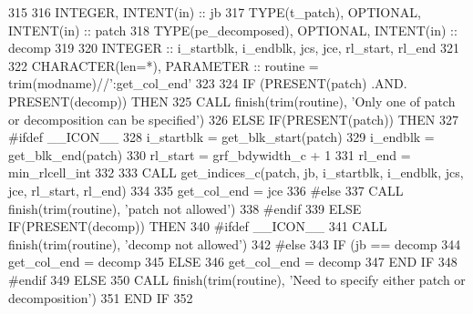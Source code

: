 \begin{DoxyCode}
315 
316     \textcolor{keywordtype}{INTEGER},                       \textcolor{keywordtype}{INTENT(in)} :: jb
317     \textcolor{keywordtype}{TYPE}(t\_patch),       \textcolor{keywordtype}{OPTIONAL}, \textcolor{keywordtype}{INTENT(in)} :: patch
318     \textcolor{keywordtype}{TYPE}(pe\_decomposed), \textcolor{keywordtype}{OPTIONAL}, \textcolor{keywordtype}{INTENT(in)} :: decomp
319 
320     \textcolor{keywordtype}{INTEGER} :: i\_startblk, i\_endblk, jcs, jce, rl\_start, rl\_end
321 
322     \textcolor{keywordtype}{CHARACTER(len=*)}, \textcolor{keywordtype}{PARAMETER} :: routine = trim(modname)//\textcolor{stringliteral}{':get\_col\_end'}
323 
324     \textcolor{keywordflow}{IF} (\textcolor{keyword}{PRESENT}(patch) .AND. \textcolor{keyword}{PRESENT}(decomp)) \textcolor{keywordflow}{THEN}
325       \textcolor{keyword}{CALL }finish(trim(routine), \textcolor{stringliteral}{'Only one of patch or decomposition can be specified'})
326     \textcolor{keywordflow}{ELSE} \textcolor{keywordflow}{IF}(\textcolor{keyword}{PRESENT}(patch)) \textcolor{keywordflow}{THEN}
327 \textcolor{preprocessor}{#ifdef \_\_ICON\_\_}
328 \textcolor{preprocessor}{}      i\_startblk = get\_blk\_start(patch)
329       i\_endblk   = get\_blk\_end(patch)
330       rl\_start   = grf\_bdywidth\_c + 1
331       rl\_end     = min\_rlcell\_int
332 
333       \textcolor{keyword}{CALL }get\_indices\_c(patch, jb, i\_startblk, i\_endblk, jcs, jce, rl\_start, rl\_end)
334 
335       get\_col\_end = jce
336 \textcolor{preprocessor}{#else}
337 \textcolor{preprocessor}{}      \textcolor{keyword}{CALL }finish(trim(routine), \textcolor{stringliteral}{'patch not allowed'})
338 \textcolor{preprocessor}{#endif}
339 \textcolor{preprocessor}{}    \textcolor{keywordflow}{ELSE} \textcolor{keywordflow}{IF}(\textcolor{keyword}{PRESENT}(decomp)) \textcolor{keywordflow}{THEN}
340 \textcolor{preprocessor}{#ifdef \_\_ICON\_\_}
341 \textcolor{preprocessor}{}      \textcolor{keyword}{CALL }finish(trim(routine), \textcolor{stringliteral}{'decomp not allowed'})
342 \textcolor{preprocessor}{#else}
343 \textcolor{preprocessor}{}      \textcolor{keywordflow}{IF} (jb == decomp%
344         get\_col\_end = decomp%
345       \textcolor{keywordflow}{ELSE}
346         get\_col\_end = decomp%
347 \textcolor{keywordflow}{     END IF}
348 \textcolor{preprocessor}{#endif}
349 \textcolor{preprocessor}{}    \textcolor{keywordflow}{ELSE}
350       \textcolor{keyword}{CALL }finish(trim(routine), \textcolor{stringliteral}{'Need to specify either patch or decomposition'})
351 \textcolor{keywordflow}{    END IF}
352 
\end{DoxyCode}


